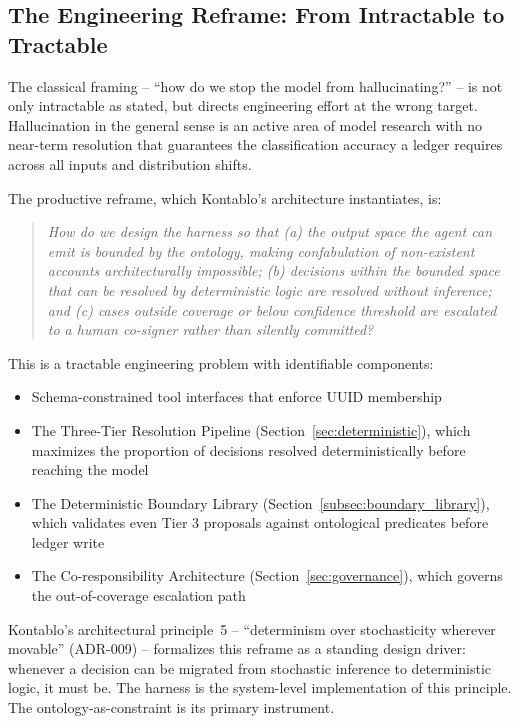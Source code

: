 \subsection{The Engineering Reframe: From Intractable to Tractable}
\label{subsec:reframe}

The classical framing -- ``how do we stop the model from hallucinating?'' --
is not only intractable as stated, but directs engineering effort at the wrong
target. Hallucination in the general sense is an active area of model research
with no near-term resolution that guarantees the classification accuracy a
ledger requires across all inputs and distribution shifts.

The productive reframe, which Kontablo's architecture instantiates, is:

\begin{quote}
\emph{How do we design the harness so that (a) the output space the agent
can emit is bounded by the ontology, making confabulation of non-existent
accounts architecturally impossible; (b) decisions within the bounded space
that can be resolved by deterministic logic are resolved without inference;
and (c) cases outside coverage or below confidence threshold are escalated
to a human co-signer rather than silently committed?}
\end{quote}

This is a tractable engineering problem with identifiable components:

\begin{itemize}
    \item Schema-constrained tool interfaces that enforce UUID membership
    \item The Three-Tier Resolution Pipeline (Section~\ref{sec:deterministic}), which maximizes
    the proportion of decisions resolved deterministically before reaching
    the model
    \item The Deterministic Boundary Library (Section~\ref{subsec:boundary_library}), which validates
    even Tier 3 proposals against ontological predicates before ledger write
    \item The Co-responsibility Architecture (Section~\ref{sec:governance}), which governs
    the out-of-coverage escalation path
\end{itemize}

Kontablo's architectural principle~5 -- ``determinism over stochasticity
wherever movable'' (ADR-009) -- formalizes this reframe as a standing design
driver: whenever a decision can be migrated from stochastic inference to
deterministic logic, it must be. The harness is the system-level
implementation of this principle. The ontology-as-constraint is its primary
instrument.

